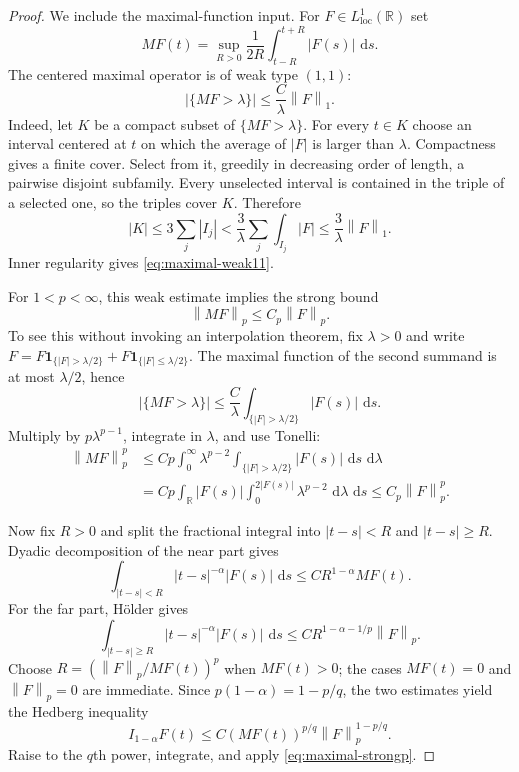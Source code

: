 \documentclass[11pt,oneside]{book}
\theoremstyle{definition}
\theoremstyle{remark}
\newcommand{\R}{\mathbb R}
\newcommand{\1}{\mathbf 1}
\newcommand{\loc}{\mathrm{loc}}
\newcommand{\dd}{\,\mathrm d}
\newcommand{\norm}[1]{\left\lVert #1\right\rVert}
\begin{document}
\begin{proof}
We include the maximal-function input.  For $F\in L^1_{\loc}(\R)$ set
\[
 MF(t)=\sup_{R>0}\frac1{2R}\int_{t-R}^{t+R}|F(s)|\,\dd s.
\]
The centered maximal operator is of weak type $(1,1)$:
\begin{equation}
 \big|\{MF>\lambda\}\big|\le \frac{C}{\lambda}\norm F_1.
 \label{eq:maximal-weak11}
\end{equation}
Indeed, let $K$ be a compact subset of $\{MF>\lambda\}$.  For every
$t\in K$ choose an interval centered at $t$ on which the average of $|F|$
is larger than $\lambda$.  Compactness gives a finite cover.  Select from it,
greedily in decreasing order of length, a pairwise disjoint subfamily.  Every
unselected interval is contained in the triple of a selected one, so the
triples cover $K$.  Therefore
\[
 |K|\le3\sum_j|I_j|
 <\frac3\lambda\sum_j\int_{I_j}|F|
 \le\frac3\lambda\norm F_1.
\]
Inner regularity gives \eqref{eq:maximal-weak11}.

For $1<p<\infty$, this weak estimate implies the strong bound
\begin{equation}
 \norm{MF}_p\le C_p\norm F_p.                      \label{eq:maximal-strongp}
\end{equation}
To see this without invoking an interpolation theorem, fix $\lambda>0$ and
write
$F=F\1_{\{|F|>\lambda/2\}}+F\1_{\{|F|\le\lambda/2\}}$.
The maximal function of the second summand is at most $\lambda/2$, hence
\[
 |\{MF>\lambda\}|
 \le\frac C\lambda\int_{\{|F|>\lambda/2\}}|F(s)|\,\dd s.
\]
Multiply by $p\lambda^{p-1}$, integrate in $\lambda$, and use Tonelli:
\begin{align*}
 \norm{MF}_p^p
 &\le Cp\int_0^\infty\lambda^{p-2}
       \int_{\{|F|>\lambda/2\}}|F(s)|\,\dd s\,\dd\lambda\\
 &=Cp\int_\R |F(s)|
      \int_0^{2|F(s)|}\lambda^{p-2}\,\dd\lambda\,\dd s
 \le C_p\norm F_p^p.
\end{align*}

Now fix $R>0$ and split the fractional integral into
$|t-s|<R$ and $|t-s|\ge R$.  Dyadic decomposition of the near part gives
\[
 \int_{|t-s|<R}|t-s|^{-\alpha}|F(s)|\,\dd s
 \le C R^{1-\alpha}MF(t).
\]
For the far part, H\"older gives
\[
 \int_{|t-s|\ge R}|t-s|^{-\alpha}|F(s)|\,\dd s
 \le C R^{1-\alpha-1/p}\norm F_p.
\]
Choose $R=(\norm F_p/MF(t))^p$ when $MF(t)>0$; the cases
$MF(t)=0$ and $\norm F_p=0$ are immediate.  Since
$p(1-\alpha)=1-p/q$, the two estimates yield the Hedberg inequality
\[
 I_{1-\alpha}F(t)
 \le C(MF(t))^{p/q}\norm F_p^{1-p/q}.
\]
Raise to the $q$th power, integrate, and apply
\eqref{eq:maximal-strongp}.
\end{proof}
\end{document}
